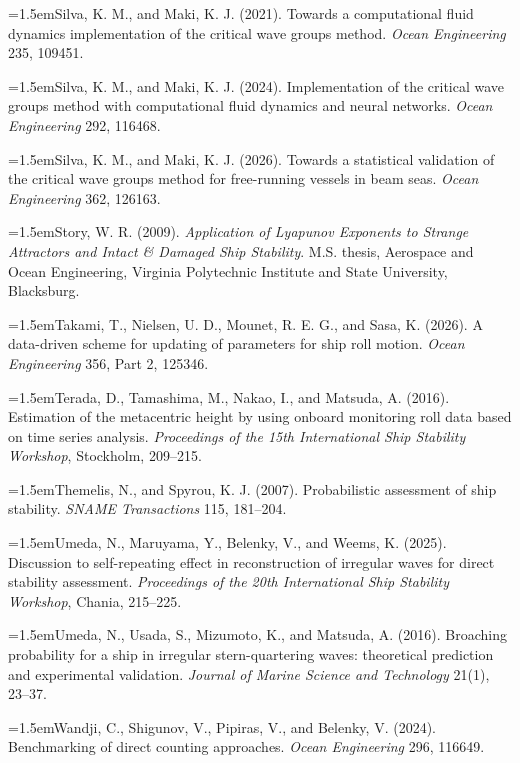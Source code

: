 \documentclass[11pt]{article}
\begin{document}
\hangindent=1.5em\noindent Silva, K. M., and Maki, K. J. (2021). Towards a computational fluid dynamics implementation of the critical wave groups method. \emph{Ocean Engineering} 235, 109451.\par
\hangindent=1.5em\noindent Silva, K. M., and Maki, K. J. (2024). Implementation of the critical wave groups method with computational fluid dynamics and neural networks. \emph{Ocean Engineering} 292, 116468.\par
\hangindent=1.5em\noindent Silva, K. M., and Maki, K. J. (2026). Towards a statistical validation of the critical wave groups method for free-running vessels in beam seas. \emph{Ocean Engineering} 362, 126163.\par
\hangindent=1.5em\noindent Story, W. R. (2009). \emph{Application of Lyapunov Exponents to Strange Attractors and Intact \& Damaged Ship Stability}. M.S. thesis, Aerospace and Ocean Engineering, Virginia Polytechnic Institute and State University, Blacksburg.\par
\hangindent=1.5em\noindent Takami, T., Nielsen, U. D., Mounet, R. E. G., and Sasa, K. (2026). A data-driven scheme for updating of parameters for ship roll motion. \emph{Ocean Engineering} 356, Part 2, 125346.\par
\hangindent=1.5em\noindent Terada, D., Tamashima, M., Nakao, I., and Matsuda, A. (2016). Estimation of the metacentric height by using onboard monitoring roll data based on time series analysis. \emph{Proceedings of the 15th International Ship Stability Workshop}, Stockholm, 209--215.\par
\hangindent=1.5em\noindent Themelis, N., and Spyrou, K. J. (2007). Probabilistic assessment of ship stability. \emph{SNAME Transactions} 115, 181--204.\par
\hangindent=1.5em\noindent Umeda, N., Maruyama, Y., Belenky, V., and Weems, K. (2025). Discussion to self-repeating effect in reconstruction of irregular waves for direct stability assessment. \emph{Proceedings of the 20th International Ship Stability Workshop}, Chania, 215--225.\par
\hangindent=1.5em\noindent Umeda, N., Usada, S., Mizumoto, K., and Matsuda, A. (2016). Broaching probability for a ship in irregular stern-quartering waves: theoretical prediction and experimental validation. \emph{Journal of Marine Science and Technology} 21(1), 23--37.\par
\hangindent=1.5em\noindent Wandji, C., Shigunov, V., Pipiras, V., and Belenky, V. (2024). Benchmarking of direct counting approaches. \emph{Ocean Engineering} 296, 116649.\par
\end{document}
